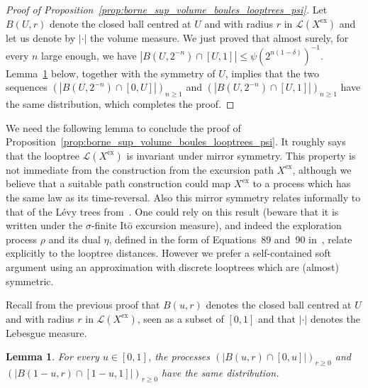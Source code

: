\documentclass[british, a4paper,11pt]{article}
\numberwithin{equation}{section}
\newtheorem{lem}[thm]{Lemma}
\theoremstyle{definition}
\newcommand{\Loop}{\mathscr{L}}
\newcommand{\exc}{\mathrm{ex}}
\begin{document}
\begin{proof}[Proof of Proposition~\ref{prop:borne_sup_volume_boules_looptrees_psi}]
Let $B(U, r)$ denote the closed ball centred at $U$ and with radius $r$ in $\Loop(X^{\exc})$ and let us denote by $|\cdot|$ the volume measure. We just proved that almost surely, for every $n$ large enough, we have $|B(U, 2^{-n}) \cap [U,1]| \leq \psi(2^{n(1-\delta)})^{-1}$.
Lemma~\ref{lem:symetrie_looptree} below, together with the symmetry of $U$, implies that the two sequences $(|B(U, 2^{-n}) \cap [0,U]|)_{n \ge 1}$ and $(|B(U, 2^{-n}) \cap [U,1]|)_{n \ge 1}$ have the same distribution, which completes the proof.
\end{proof}

We need the following lemma to conclude the proof of Proposition~\ref{prop:borne_sup_volume_boules_looptrees_psi}. It roughly says that the looptree $\Loop(X^{\exc})$ is invariant under mirror symmetry.
This property is not immediate from the construction from the excursion path $X^{\exc}$, although we believe that a suitable path construction could map $X^{\exc}$ to a process which has the same law as its time-reversal.
Also this mirror symmetry relates informally to that of the L\'evy trees from~\cite[Corollary~3.1.6]{DLG02}.
One could rely on this result (beware that it is written under the $\sigma$-finite It\=o excursion measure), and indeed the exploration process $\rho$ and its dual $\eta$, defined in the form of Equations~89 and~90 in~\cite{DLG02}, relate explicitly to the looptree distances.
However we prefer a self-contained soft argument using an approximation with discrete looptrees which are (almost) symmetric.

Recall from the previous proof that $B(u, r)$ denotes the closed ball centred at $U$ and with radius $r$ in $\Loop(X^{\exc})$, seen as a subset of $[0,1]$ and that $|\cdot|$ denotes the Lebesgue measure.

\begin{lem}\label{lem:symetrie_looptree}
For every $u \in [0,1]$, the processes $(|B(u, r) \cap [0,u]|)_{r \ge 0}$ and $(|B(1-u, r) \cap [1-u,1]|)_{r \ge 0}$ have the same distribution.
\end{lem}
\end{document}
